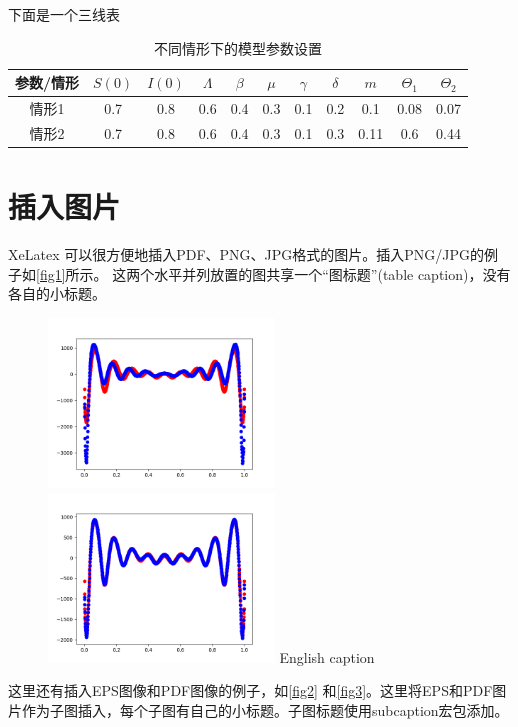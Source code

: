 下面是一个三线表
\begin{table}[htbp]
  \centering
  \caption{\heiti{}不同情形下的模型参数设置}
            
  \label{tab:parameter}
  \begin{tabular}{ccccccccccc}
    \toprule
    参数/情形 & $S(0)$ & $I(0)$ & $\Lambda$ & $\beta$ & $\mu$ & $\gamma$ & $\delta$ & $m$ & $\Theta_1$ & $\Theta_2$ \\
    \midrule
    情形1 & 0.7 & 0.8 & 0.6 & 0.4 & 0.3 & 0.1 & 0.2 & 0.1  & 0.08 & 0.07 \\
    情形2 & 0.7 & 0.8 & 0.6 & 0.4 & 0.3 & 0.1 & 0.3 & 0.11 & 0.6  & 0.44 \\
    \bottomrule
  \end{tabular}
\end{table}
\section{插入图片}

XeLatex 可以很方便地插入PDF、PNG、JPG格式的图片。插入PNG/JPG的例子如\autoref{fig1}所示。
这两个水平并列放置的图共享一个“图标题”(table caption)，没有各自的小标题。

\begin{figure}[htp]
	\centering
	\includegraphics[width=6cm]{figure/example/model1_1000.png}
	\hspace{1cm}
	\includegraphics[width=6cm]{figure/example/model1_10000.png}
	{English caption}
	\label{fig1}
\end{figure}

这里还有插入EPS图像和PDF图像的例子，如\autoref{fig2} 和\autoref{fig3}。这里将EPS和PDF图片作为子图插入，每个子图有自己的小标题。子图标题使用subcaption宏包添加。

